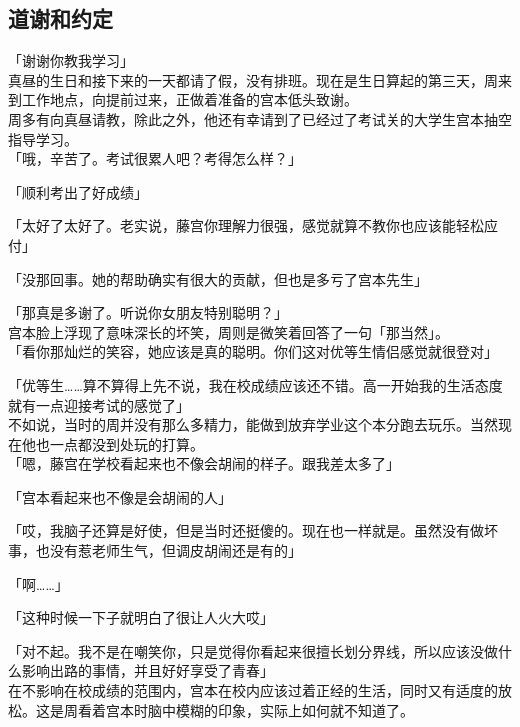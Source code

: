 \subsection{道谢和约定}

「谢谢你教我学习」\\

真昼的生日和接下来的一天都请了假，没有排班。现在是生日算起的第三天，周来到工作地点，向提前过来，正做着准备的宫本低头致谢。\\

周多有向真昼请教，除此之外，他还有幸请到了已经过了考试关的大学生宫本抽空指导学习。\\

「哦，辛苦了。考试很累人吧？考得怎么样？」

「顺利考出了好成绩」

「太好了太好了。老实说，藤宫你理解力很强，感觉就算不教你也应该能轻松应付」

「没那回事。她的帮助确实有很大的贡献，但也是多亏了宫本先生」

「那真是多谢了。听说你女朋友特别聪明？」\\

宫本脸上浮现了意味深长的坏笑，周则是微笑着回答了一句「那当然」。\\

「看你那灿烂的笑容，她应该是真的聪明。你们这对优等生情侣感觉就很登对」

「优等生……算不算得上先不说，我在校成绩应该还不错。高一开始我的生活态度就有一点迎接考试的感觉了」\\

不如说，当时的周并没有那么多精力，能做到放弃学业这个本分跑去玩乐。当然现在他也一点都没到处玩的打算。\\

「嗯，藤宫在学校看起来也不像会胡闹的样子。跟我差太多了」

「宫本看起来也不像是会胡闹的人」

「哎，我脑子还算是好使，但是当时还挺傻的。现在也一样就是。虽然没有做坏事，也没有惹老师生气，但调皮胡闹还是有的」

「啊……」

「这种时候一下子就明白了很让人火大哎」

「对不起。我不是在嘲笑你，只是觉得你看起来很擅长划分界线，所以应该没做什么影响出路的事情，并且好好享受了青春」\\

在不影响在校成绩的范围内，宫本在校内应该过着正经的生活，同时又有适度的放松。这是周看着宫本时脑中模糊的印象，实际上如何就不知道了。

